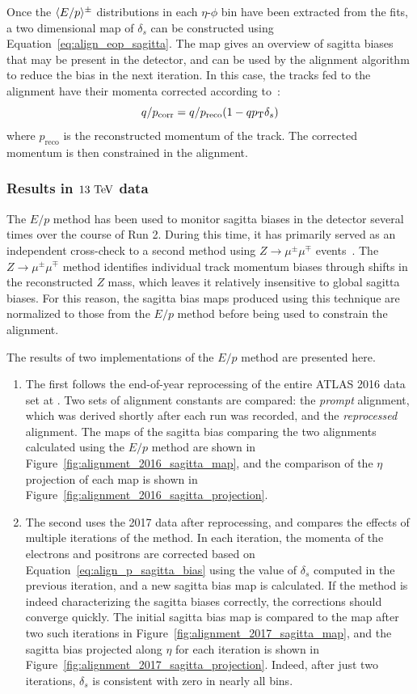 Once the $\langle E/p\rangle^\pm$ distributions in each $\eta$-$\phi$ bin have been extracted from the fits, a two dimensional map of $\delta_s$ can be constructed using Equation~\ref{eq:align_eop_sagitta}.
The map gives an overview of sagitta biases that may be present in the detector, and can be used by the alignment algorithm to reduce the bias in the next iteration.
In this case, the tracks fed to the alignment have their momenta corrected according to~\cite{2012.alignment-systematics}:
\begin{equation}
q/p_{\textrm{corr}} = q/p_{\textrm{reco}}(1-qp_{\mathrm{T}}\delta_s)
\end{equation}
where $p_{\textrm{reco}}$ is the reconstructed momentum of the track.
The corrected momentum is then constrained in the alignment.

\subsubsection{Results in $13\tev$ data}
The $E/p$ method has been used to monitor sagitta biases in the detector several times over the course of Run 2.
During this time, it has primarily served as an independent cross-check to a second method using $Z\rightarrow\mu^{\pm}\mu^{\mp}$ events~\cite{2012.alignment-systematics}.
The $Z\rightarrow\mu^{\pm}\mu^{\mp}$ method identifies individual track momentum biases through shifts in the reconstructed $Z$ mass, which leaves it relatively insensitive to global sagitta biases.
For this reason, the sagitta bias maps produced using this technique are normalized to those from the $E/p$ method before being used to constrain the alignment.

The results of two implementations of the $E/p$ method are presented here.
\begin{enumerate}
\item The first follows the end-of-year reprocessing of the entire ATLAS 2016 data set at .
Two sets of alignment constants are compared: the \emph{prompt} alignment, which was derived shortly after each run was recorded, and the \emph{reprocessed} alignment.
The maps of the sagitta bias comparing the two alignments calculated using the $E/p$ method are shown in Figure~\ref{fig:alignment_2016_sagitta_map}, and the comparison of the $\eta$ projection of each map is shown in Figure~\ref{fig:alignment_2016_sagitta_projection}.
\item The second uses the 2017 data after reprocessing, and compares the effects of multiple iterations of the method.
In each iteration, the momenta of the electrons and positrons are corrected based on Equation~\ref{eq:align_p_sagitta_bias} using the value of $\delta_s$ computed in the previous iteration, and a new sagitta bias map is calculated.
If the method is indeed characterizing the sagitta biases correctly, the corrections should converge quickly.
The initial sagitta bias map is compared to the map after two such iterations in Figure~\ref{fig:alignment_2017_sagitta_map}, and the sagitta bias projected along $\eta$ for each iteration is shown in Figure~\ref{fig:alignment_2017_sagitta_projection}.
Indeed, after just two iterations, $\delta_s$ is consistent with zero in nearly all bins.
\end{enumerate}

